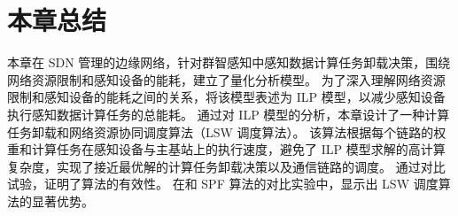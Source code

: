 \section{本章总结}

本章在 SDN 管理的边缘网络，针对群智感知中感知数据计算任务卸载决策，围绕网络资源限制和感知设备的能耗，建立了量化分析模型。
为了深入理解网络资源限制和感知设备的能耗之间的关系，将该模型表述为 ILP 模型，以减少感知设备执行感知数据计算任务的总能耗。
通过对 ILP 模型的分析，本章设计了一种计算任务卸载和网络资源协同调度算法（LSW 调度算法）。
该算法根据每个链路的权重和计算任务在感知设备与主基站上的执行速度，避免了 ILP 模型求解的高计算复杂度，实现了接近最优解的计算任务卸载决策以及通信链路的调度。
通过对比试验，证明了算法的有效性。
在和 SPF 算法的对比实验中，显示出 LSW 调度算法的显著优势。



